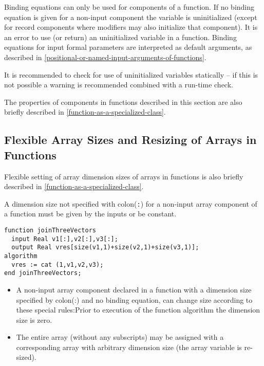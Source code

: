 Binding equations can only be used for components of a function.
If no binding equation is given for a non-input component the
variable is uninitialized (except for record components where modifiers
may also initialize that component). It is an error to use (or return)
an uninitialized variable in a function.  Binding equations for input
formal parameters are interpreted as default arguments, as described in
\cref{positional-or-named-input-arguments-of-functions}.

\begin{nonnormative}
It is recommended to check for use of uninitialized variables statically -- if this is not possible a warning is recommended
combined with a run-time check.
\end{nonnormative}

\begin{nonnormative}
The properties of components in functions described in this
section are also briefly described in \cref{function-as-a-specialized-class}.
\end{nonnormative}

\subsection{Flexible Array Sizes and Resizing of Arrays in Functions}\label{flexible-array-sizes-and-resizing-of-arrays-in-functions}

\begin{nonnormative}
Flexible setting of array dimension sizes of arrays in
functions is also briefly described in \cref{function-as-a-specialized-class}.
\end{nonnormative}

A dimension size not specified with colon(\lstinline!:!) for a non-input array
component of a function must be given by the inputs or be constant.

\begin{example}
\begin{lstlisting}[language=modelica]
function joinThreeVectors
  input Real v1[:],v2[:],v3[:];
  output Real vres[size(v1,1)+size(v2,1)+size(v3,1)];
algorithm
  vres := cat (1,v1,v2,v3);
end joinThreeVectors;
\end{lstlisting}
\end{example}

\begin{itemize}
\item
  A non-input array component declared in a function with a dimension
  size specified by colon(:) and no binding equation, can change
  size according to these special rules:Prior to execution of the
  function algorithm the dimension size is zero.
\item
  The entire array (without any subscripts) may be assigned with a
  corresponding array with arbitrary dimension size (the array variable
  is re-sized).
\end{itemize}

